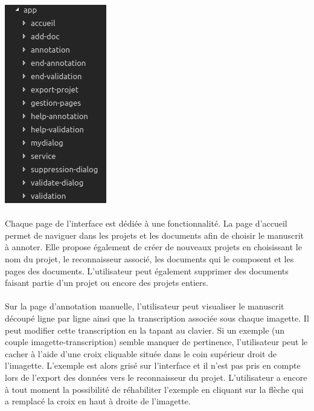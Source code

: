\begin{mdframed}[frametitle={Figure 5 : Arborescence des composants de l'interface}, innerbottommargin=10]
\begin{center}
\includegraphics[scale=0.5]{assets/arborescenceIHM.png}
\end{center}
\end{mdframed}

\paragraph{}
Chaque page de l'interface est dédiée à une fonctionnalité. La page d'accueil permet de naviguer dans les projets et les documents afin de choisir le manuscrit à annoter. Elle propose également de créer de nouveaux projets en choisissant le nom du projet, le reconnaisseur associé, les documents qui le composent et les pages des documents. L'utilisateur peut également supprimer des documents faisant partie d'un projet ou encore des projets entiers.

\paragraph{}
Sur la page d'annotation manuelle, l'utilisateur peut visualiser le manuscrit découpé ligne par ligne ainsi que la transcription associée sous chaque imagette. Il peut modifier cette transcription en la tapant au clavier. Si un exemple (un couple imagette-transcription) semble manquer de pertinence, l'utilisateur peut le cacher à l'aide d'une croix cliquable située dans le coin supérieur droit de l'imagette. L'exemple est alors grisé sur l'interface et il n'est pas pris en compte lors de l'export des données vers le reconnaisseur du projet. L'utilisateur a encore à tout moment la possibilité de réhabiliter l'exemple en cliquant sur la flèche qui a remplacé la croix en haut à droite de l'imagette.


